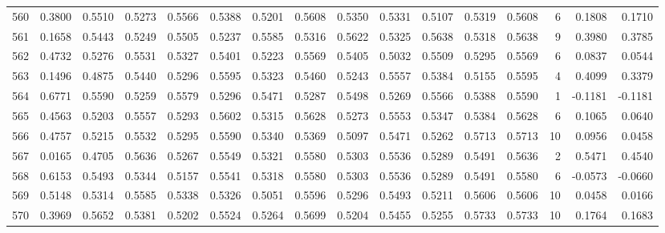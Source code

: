 \begin{tabular}{lrrrrrrrrrrrrrrr}
560 &      0.3800 &  0.5510 &  0.5273 &  0.5566 &  0.5388 &  0.5201 &  0.5608 &  0.5350 &  0.5331 &  0.5107 &   0.5319 &     0.5608 &      6 &                    0.1808 &                     0.1710 \\
561 &      0.1658 &  0.5443 &  0.5249 &  0.5505 &  0.5237 &  0.5585 &  0.5316 &  0.5622 &  0.5325 &  0.5638 &   0.5318 &     0.5638 &      9 &                    0.3980 &                     0.3785 \\
562 &      0.4732 &  0.5276 &  0.5531 &  0.5327 &  0.5401 &  0.5223 &  0.5569 &  0.5405 &  0.5032 &  0.5509 &   0.5295 &     0.5569 &      6 &                    0.0837 &                     0.0544 \\
563 &      0.1496 &  0.4875 &  0.5440 &  0.5296 &  0.5595 &  0.5323 &  0.5460 &  0.5243 &  0.5557 &  0.5384 &   0.5155 &     0.5595 &      4 &                    0.4099 &                     0.3379 \\
564 &      0.6771 &  0.5590 &  0.5259 &  0.5579 &  0.5296 &  0.5471 &  0.5287 &  0.5498 &  0.5269 &  0.5566 &   0.5388 &     0.5590 &      1 &                   -0.1181 &                    -0.1181 \\
565 &      0.4563 &  0.5203 &  0.5557 &  0.5293 &  0.5602 &  0.5315 &  0.5628 &  0.5273 &  0.5553 &  0.5347 &   0.5384 &     0.5628 &      6 &                    0.1065 &                     0.0640 \\
566 &      0.4757 &  0.5215 &  0.5532 &  0.5295 &  0.5590 &  0.5340 &  0.5369 &  0.5097 &  0.5471 &  0.5262 &   0.5713 &     0.5713 &     10 &                    0.0956 &                     0.0458 \\
567 &      0.0165 &  0.4705 &  0.5636 &  0.5267 &  0.5549 &  0.5321 &  0.5580 &  0.5303 &  0.5536 &  0.5289 &   0.5491 &     0.5636 &      2 &                    0.5471 &                     0.4540 \\
568 &      0.6153 &  0.5493 &  0.5344 &  0.5157 &  0.5541 &  0.5318 &  0.5580 &  0.5303 &  0.5536 &  0.5289 &   0.5491 &     0.5580 &      6 &                   -0.0573 &                    -0.0660 \\
569 &      0.5148 &  0.5314 &  0.5585 &  0.5338 &  0.5326 &  0.5051 &  0.5596 &  0.5296 &  0.5493 &  0.5211 &   0.5606 &     0.5606 &     10 &                    0.0458 &                     0.0166 \\
570 &      0.3969 &  0.5652 &  0.5381 &  0.5202 &  0.5524 &  0.5264 &  0.5699 &  0.5204 &  0.5455 &  0.5255 &   0.5733 &     0.5733 &     10 &                    0.1764 &                     0.1683 \\

\end{tabular}
